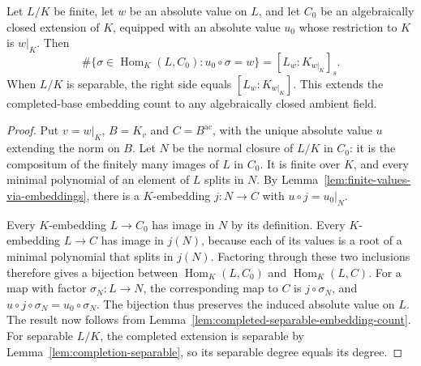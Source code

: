 \begin{lemma}
\label{lem:embedding-count-algclosed}
\leanok
{}
Let $L/K$ be finite, let $w$ be an absolute value on $L$,
and let $C_0$ be an algebraically closed extension of $K$, equipped
with an absolute value $u_0$ whose restriction to $K$ is $w|_K$.
Then
\[
 \#\{\sigma\in\operatorname{Hom}_K(L,C_0):u_0\circ\sigma=w\}
 =[L_w:K_{w|_K}]_s.
\]
When $L/K$ is separable, the right side equals $[L_w:K_{w|_K}]$.
This extends the completed-base embedding count to any algebraically
closed ambient field.
\end{lemma}
\begin{proof}
Put $v=w|_K$, $B=K_v$ and $C=B^{\mathrm{ac}}$, with the unique
absolute value $u$ extending the norm on $B$.
Let $N$ be the normal closure of $L/K$ in $C_0$: it is the
compositum of the finitely many images of $L$ in $C_0$.
It is finite over $K$, and every minimal polynomial of an element
of $L$ splits in $N$. By Lemma~\ref{lem:finite-values-via-embeddings},
there is a $K$-embedding $j:N\to C$ with $u\circ j=u_0|_N$.

Every $K$-embedding $L\to C_0$ has image in $N$ by its definition.
Every $K$-embedding $L\to C$ has image in $j(N)$, because each of
its values is a root of a minimal polynomial that splits in $j(N)$.
Factoring through these two inclusions therefore gives a bijection
between $\operatorname{Hom}_K(L,C_0)$ and $\operatorname{Hom}_K(L,C)$.
For a map with factor $\sigma_N:L\to N$, the corresponding map to
$C$ is $j\circ\sigma_N$, and
$u\circ j\circ\sigma_N=u_0\circ\sigma_N$.
The bijection thus preserves the induced absolute value on $L$.
The result now follows from Lemma~\ref{lem:completed-separable-embedding-count}.
For separable $L/K$, the completed extension is separable by
Lemma~\ref{lem:completion-separable}, so its separable degree equals its degree.
\end{proof}

